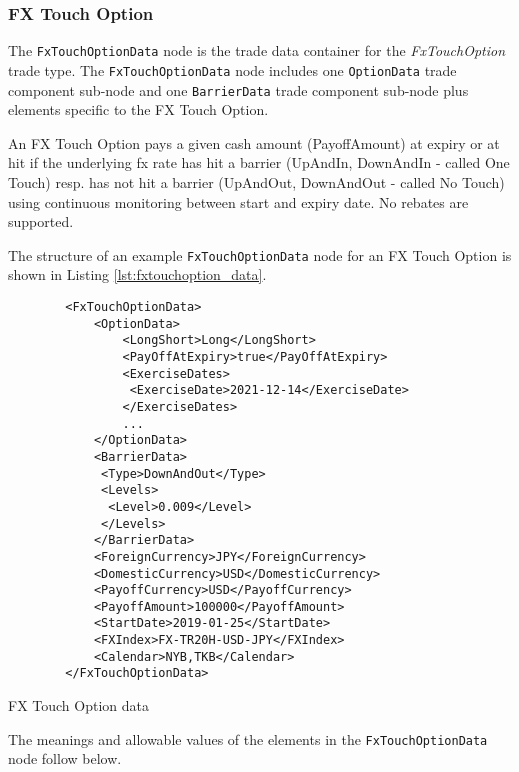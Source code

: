 \subsubsection{FX Touch Option}

The \lstinline!FxTouchOptionData!  node is the trade data container for the \emph{FxTouchOption} trade type.   The
\lstinline!FxTouchOptionData!  node includes one  \lstinline!OptionData! trade component sub-node and one \lstinline!BarrierData! trade component sub-node plus elements
specific to the FX Touch Option. 

An FX Touch Option pays a given cash amount (PayoffAmount) at expiry or at hit if the underlying fx rate has hit a barrier (UpAndIn, DownAndIn - called One Touch) resp. has not hit a barrier (UpAndOut, DownAndOut - called No Touch) using continuous monitoring between start and expiry date. No rebates are supported. 

The structure of an example \lstinline!FxTouchOptionData! node for an FX Touch Option is shown in Listing
\ref{lst:fxtouchoption_data}.

\begin{listing}[H]
\begin{verbatim}
        <FxTouchOptionData>
            <OptionData>
                <LongShort>Long</LongShort>
                <PayOffAtExpiry>true</PayOffAtExpiry>
                <ExerciseDates>
                 <ExerciseDate>2021-12-14</ExerciseDate>
                </ExerciseDates>
                ...                 
            </OptionData>
            <BarrierData>
             <Type>DownAndOut</Type>
             <Levels>
              <Level>0.009</Level>
             </Levels>
            </BarrierData>
            <ForeignCurrency>JPY</ForeignCurrency>
            <DomesticCurrency>USD</DomesticCurrency>
            <PayoffCurrency>USD</PayoffCurrency>
            <PayoffAmount>100000</PayoffAmount>            
            <StartDate>2019-01-25</StartDate>
            <FXIndex>FX-TR20H-USD-JPY</FXIndex>            
            <Calendar>NYB,TKB</Calendar>
        </FxTouchOptionData>
\end{verbatim}
\caption{FX Touch Option data}
\label{lst:fxtouchoption_data}
\end{listing}

The meanings and allowable values of the elements in the \lstinline!FxTouchOptionData!  node follow below.

